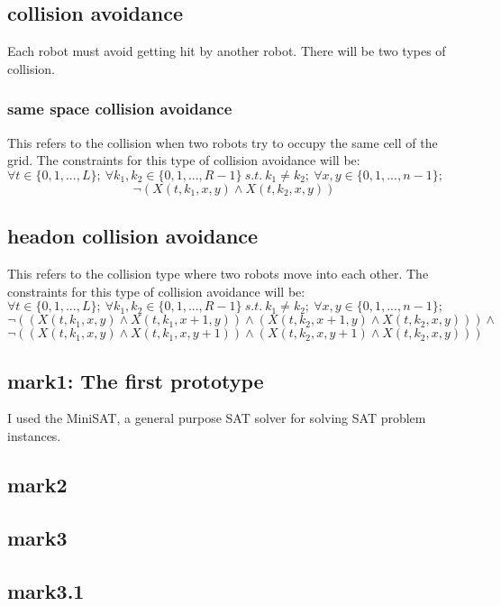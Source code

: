 \documentclass{article}[11pt]
\begin{document}
		\subsection{collision avoidance}
			Each robot must avoid getting hit by another robot. There will be two types of collision.
			\subsubsection{same space collision avoidance}
				This refers to the collision when two robots try to occupy the same cell of the grid. The constraints for this type of collision avoidance will be:\\
				$\forall t \in \{0, 1, ..., L\};\ \forall k_1,k_2 \in \{0, 1, ..., R-1\}\ s.t.\ k_1 \neq k_2;\ \forall x,y \in \{0,1,...,n-1\};$
				$$
					\neg (X(t, k_1, x, y) \wedge X(t, k_2, x, y))
				$$
			\subsection{headon collision avoidance}
				This refers to the collision type where two robots move into each other. The constraints for this type of collision avoidance will be:\\
				$\forall t \in \{0, 1, ..., L\};\ \forall k_1,k_2 \in \{0, 1, ..., R-1\}\ s.t.\ k_1 \neq k_2;\ \forall x,y \in \{0,1,...,n-1\};$
				$$
					\neg((X(t, k_1, x, y) \wedge X(t, k_1, x+1, y)) \wedge (X(t, k_2, x+1, y) \wedge X(t, k_2, x, y))) \wedge
				$$
				$$
					\neg((X(t, k_1, x, y) \wedge X(t, k_1, x, y+1)) \wedge (X(t, k_2, x, y+1) \wedge X(t, k_2, x, y)))
				$$


		\subsection{mark1: The first prototype}
			I used the MiniSAT, a general purpose SAT solver for solving SAT problem instances. 



		\subsection{mark2}
		\subsection{mark3}
		\subsection{mark3.1}
\end{document}
